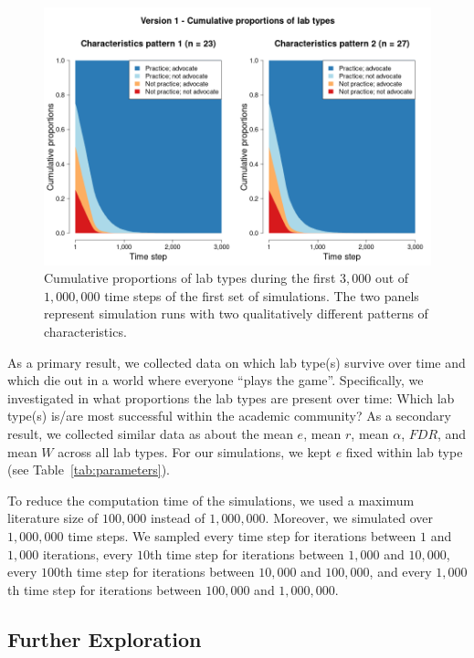 \documentclass[meta, authordate,issue]{jote-new-article}
\begin{document}
\begin{figure}[!t]
  \begin{fullwidth}
    \centering
    \includegraphics[width=\textwidth]{v1_pro_plot_main.png}
    \caption{Cumulative proportions of lab types during the first $3,000$ out of $1,000,000$ time steps of the first set of simulations. The two panels represent simulation runs with two qualitatively different patterns of characteristics.}
    \label{fig:v1_pro_plot_main}
  \end{fullwidth}
\end{figure}

As a primary result, we collected data on which lab type(s) survive over time and which die out in a world where everyone ``plays the game''. Specifically, we investigated in what proportions the lab types are present over time: Which lab type(s) is/are most successful within the academic community? As a secondary result, we collected similar data as \textcite{SmaldinoMcelreath2016} about the mean $e$, mean $r$, mean $\alpha$, $FDR$, and mean $W$ across all lab types. For our simulations, we kept $e$ fixed within lab type (see Table~\ref{tab:parameters}).

To reduce the computation time of the simulations, we used a maximum literature size of $100,000$ instead of $1,000,000$. Moreover, we simulated over $1,000,000$ time steps. We sampled every time step for iterations between $1$ and $1,000$ iterations, every $10$th time step for iterations between $1,000$ and $10,000$, every $100$th time step for iterations between $10,000$ and $100,000$, and every $1,000$th time step for iterations between $100,000$ and $1,000,000$.

\subsection{Further Exploration}
\end{document}

